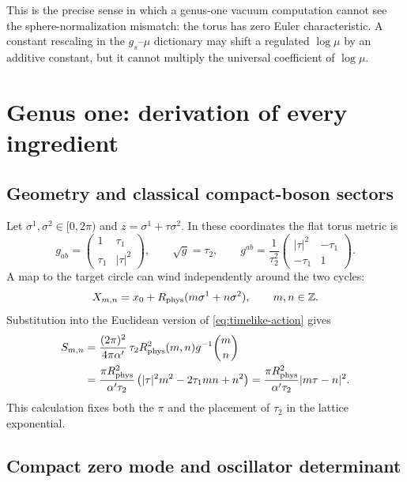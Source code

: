 \documentclass[11pt]{article}
\numberwithin{equation}{section}
\newcommand{\A}{\alpha'}
\begin{document}
This is the precise sense in which a genus-one vacuum computation cannot see
the sphere-normalization mismatch: the torus has zero Euler characteristic.
A constant rescaling in the $g_s$--$\mu$ dictionary may shift a regulated
$\log\mu$ by an additive constant, but it cannot multiply the universal
coefficient of $\log\mu$.

\section{Genus one: derivation of every ingredient}

\subsection{Geometry and classical compact-boson sectors}

Let $\sigma^1,\sigma^2\in[0,2\pi)$ and
$z=\sigma^1+\tau\sigma^2$.  In these coordinates the flat torus metric is
\begin{equation}
 g_{ab}=\begin{pmatrix}1&\tau_1\\ \tau_1&|\tau|^2\end{pmatrix},
 \qquad
 \sqrt g=\tau_2,
 \qquad
 g^{ab}=\frac1{\tau_2^2}
 \begin{pmatrix}|\tau|^2&-\tau_1\\-\tau_1&1\end{pmatrix}.
 \label{eq:torus-metric}
\end{equation}
A map to the target circle can wind independently around the two cycles:
\begin{equation}
 X_{m,n}=x_0+R_{\rm phys}(m\sigma^1+n\sigma^2),
 \qquad m,n\in\mathbb Z.
\end{equation}
Substitution into the Euclidean version of \eqref{eq:timelike-action} gives
\begin{align}
 S_{m,n}
 &=\frac{(2\pi)^2}{4\pi\A}\,
 \tau_2 R_{\rm phys}^2(m,n)g^{-1}\binom mn \notag\\
 &=\frac{\pi R_{\rm phys}^2}{\A\tau_2}
 \left(|\tau|^2m^2-2\tau_1mn+n^2\right)
 =\frac{\pi R_{\rm phys}^2}{\A\tau_2}|m\tau-n|^2.
 \label{eq:compact-classical-action}
\end{align}
This calculation fixes both the $\pi$ and the placement of $\tau_2$ in the
lattice exponential.

\subsection{Compact zero mode and oscillator determinant}
\end{document}
